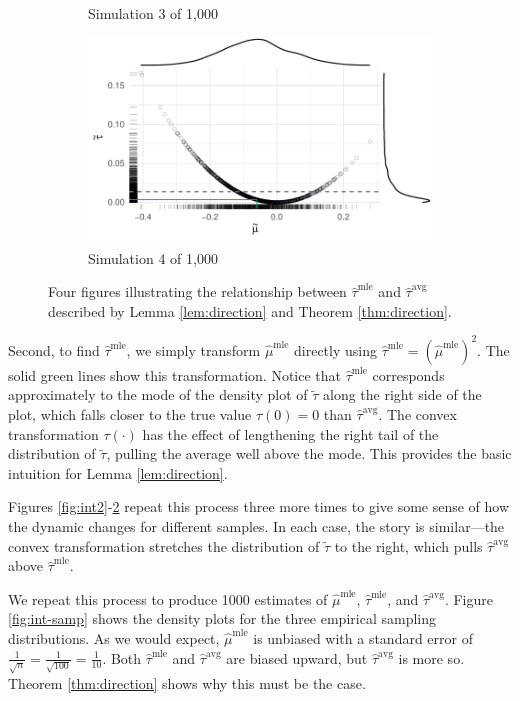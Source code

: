 \documentclass[11pt]{article}
\begin{document}
\begin{figure}
\begin{subfigure}{.5\textwidth}
  \caption{Simulation 3 of 1,000}
  \label{fig:int3}
\end{subfigure}%
\begin{subfigure}{.5\textwidth}
  \centering
  \includegraphics[width=.85\linewidth]{figs/intuition-4.pdf}
  \caption{Simulation 4 of 1,000}
  \label{fig:int4}
\end{subfigure}

\vspace{.1in}
\caption{Four figures illustrating the relationship between $\hat{\tau}^\text{mle}$ and $\hat{\tau}^\text{avg}$ described by Lemma \ref{lem:direction} and Theorem \ref{thm:direction}.}
\label{fig:int}
\end{figure}


Second, to find $\hat{\tau}^\text{mle}$, we simply transform $\hat{\mu}^\text{mle}$ directly using $\hat{\tau}^\text{mle} = \left( \hat{\mu}^\text{mle} \right) ^2$.
The solid green lines show this transformation.
Notice that $\hat{\tau}^\text{mle}$ corresponds approximately to the mode of the density plot of $\tilde{\tau}$ along the right side of the plot, which falls closer to the true value $\tau(0) = 0$ than $\hat{\tau}^\text{avg}$.
The convex transformation $\tau(\cdot)$ has the effect of lengthening the right tail of the distribution of $\tilde{\tau}$, pulling the average well above the mode.
This provides the basic intuition for Lemma \ref{lem:direction}.

Figures \ref{fig:int2}-\ref{fig:int4} repeat this process three more times to give some sense of how the dynamic changes for different samples.
In each case, the story is similar---the convex transformation stretches the distribution of $\tilde{\tau}$ to the right, which pulls $\hat{\tau}^\text{avg}$ above $\hat{\tau}^\text{mle}$.

We repeat this process to produce 1000 estimates of $\hat{\mu}^\text{mle}$, $\hat{\tau}^\text{mle}$, and $\hat{\tau}^\text{avg}$.
Figure \ref{fig:int-samp} shows the density plots for the three empirical sampling distributions.
As we would expect, $\hat{\mu}^\text{mle}$ is unbiased with a standard error of $\frac{1}{\sqrt{n}} = \frac{1}{\sqrt{100}} = \frac{1}{10}$.
Both $\hat{\tau}^\text{mle}$ and $\hat{\tau}^\text{avg}$ are biased upward, but $\hat{\tau}^\text{avg}$ is more so.
Theorem \ref{thm:direction} shows why this must be the case.
\end{document}
